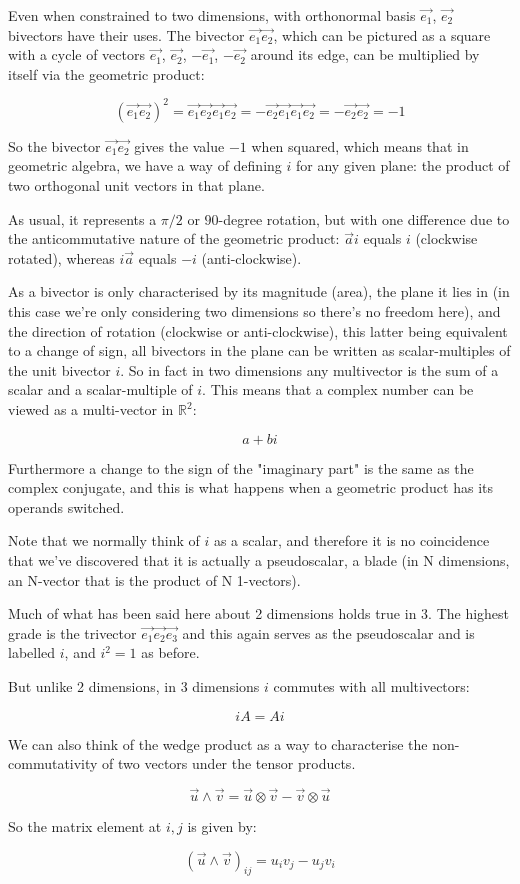Even when constrained to two dimensions, with orthonormal basis $\vec{e_1}$, $\vec{e_2}$ bivectors have their uses. The bivector $\vec{e_1}\vec{e_2}$, which can be pictured as a square with a cycle of vectors $\vec{e_1}$, $\vec{e_2}$, $-\vec{e_1}$, $-\vec{e_2}$ around its edge, can be multiplied by itself via the geometric product:

$$
(\vec{e_1}\vec{e_2})^2
= \vec{e_1}\vec{e_2}\vec{e_1}\vec{e_2}
= -\vec{e_2}\vec{e_1}\vec{e_1}\vec{e_2}
= -\vec{e_2}\vec{e_2}
= -1
$$

So the bivector $\vec{e_1}\vec{e_2}$ gives the value $-1$ when squared, which means that in geometric algebra, we have a way of defining $i$ for any given plane: the product of two orthogonal unit vectors in that plane.

As usual, it represents a $\pi/2$ or $90$-degree rotation, but with one difference due to the anticommutative nature of the geometric product: $\vec{a}i$ equals $i$ (clockwise rotated), whereas $i\vec{a}$ equals $-i$ (anti-clockwise).

As a bivector is only characterised by its magnitude (area), the plane it lies in (in this case we're only considering two dimensions so there's no freedom here), and the direction of rotation (clockwise or anti-clockwise), this latter being equivalent to a change of sign, all bivectors in the plane can be written as scalar-multiples of the unit bivector $i$. So in fact in two dimensions any multivector is the sum of a scalar and a scalar-multiple of $i$. This means that a complex number can be viewed as a multi-vector in $\mathbb{R}^2$:

$$a+bi$$

Furthermore a change to the sign of the "imaginary part" is the same as the complex conjugate, and this is what happens when a geometric product has its operands switched.

Note that we normally think of $i$ as a scalar, and therefore it is no coincidence that we've discovered that it is actually a pseudoscalar, a blade (in N dimensions, an N-vector that is the product of N 1-vectors).

Much of what has been said here about 2 dimensions holds true in 3. The highest grade is the trivector $\vec{e_1}\vec{e_2}\vec{e_3}$ and this again serves as the pseudoscalar and is labelled $i$, and $i^2=1$ as before.

But unlike 2 dimensions, in 3 dimensions $i$ commutes with all multivectors:

$$iA = Ai$$

We can also think of the wedge product as a way to characterise the non-commutativity of two vectors under the tensor products.

$$\vec{u} \wedge \vec{v} = \vec{u} \otimes \vec{v} - \vec{v} \otimes \vec{u}$$

So the matrix element at $i, j$ is given by:

$$(\vec{u} \wedge \vec{v})_{ij} = u_i v_j - u_j v_i$$

